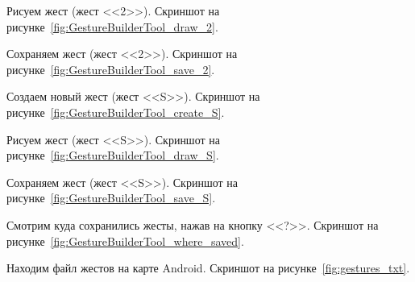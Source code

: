 \documentclass[12pt, a4paper, simple]{eskdtext}
\begin{document}
    Рисуем жест (жест <<2>>). Скриншот на рисунке~\ref{fig:GestureBuilderTool_draw_2}.

    Сохраняем жест (жест <<2>>). Скриншот на рисунке~\ref{fig:GestureBuilderTool_save_2}.

    Создаем новый жест (жест <<S>>). Скриншот на рисунке~\ref{fig:GestureBuilderTool_create_S}.

    Рисуем жест (жест <<S>>). Скриншот на рисунке~\ref{fig:GestureBuilderTool_draw_S}.

    Сохраняем жест (жест <<S>>). Скриншот на рисунке~\ref{fig:GestureBuilderTool_save_S}.

    Смотрим куда сохранились жесты, нажав на кнопку <<?>>. Скриншот на рисунке~\ref{fig:GestureBuilderTool_where_saved}.

    Находим файл жестов на карте Android. Скриншот на рисунке~\ref{fig:gestures_txt}.
\end{document}
